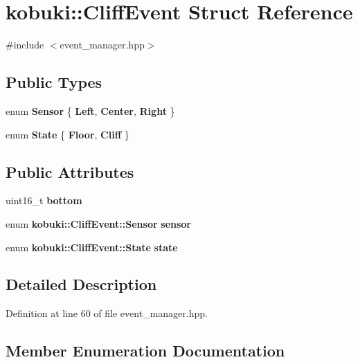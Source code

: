 \section{kobuki\-:\-:\-Cliff\-Event \-Struct \-Reference}
\label{structkobuki_1_1CliffEvent}


{\ttfamily \#include $<$event\-\_\-manager.\-hpp$>$}

\subsection*{\-Public \-Types}
\begin{DoxyCompactItemize}
\item 
enum {\bf \-Sensor} \{ {\bf \-Left}, 
{\bf \-Center}, 
{\bf \-Right}
 \}
\item 
enum {\bf \-State} \{ {\bf \-Floor}, 
{\bf \-Cliff}
 \}
\end{DoxyCompactItemize}
\subsection*{\-Public \-Attributes}
\begin{DoxyCompactItemize}
\item 
uint16\-\_\-t {\bf bottom}
\item 
enum {\bf kobuki\-::\-Cliff\-Event\-::\-Sensor} {\bf sensor}
\item 
enum {\bf kobuki\-::\-Cliff\-Event\-::\-State} {\bf state}
\end{DoxyCompactItemize}


\subsection{\-Detailed \-Description}


\-Definition at line 60 of file event\-\_\-manager.\-hpp.



\subsection{\-Member \-Enumeration \-Documentation}

